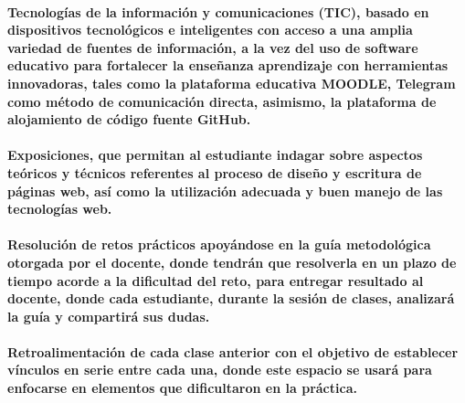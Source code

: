 \paragraph{\textbf{Tecnologías de la información y comunicaciones (TIC)}, basado en dispositivos tecnológicos e inteligentes con acceso a una amplia variedad de fuentes de información, a la vez del uso de software educativo para fortalecer la enseñanza aprendizaje con herramientas innovadoras, tales como la plataforma educativa MOODLE, Telegram como método de comunicación directa, asimismo, la plataforma de alojamiento de código fuente GitHub.}

\paragraph{\textbf{Exposiciones}, que permitan al estudiante indagar sobre aspectos teóricos y técnicos referentes al proceso de diseño y escritura de páginas web, así como la utilización adecuada y buen manejo de las tecnologías web.}

\paragraph{\textbf{Resolución de retos prácticos} apoyándose en la guía metodológica otorgada por el docente, donde tendrán que resolverla en un plazo de tiempo acorde a la dificultad del reto, para entregar resultado al docente, donde cada estudiante, durante la sesión de clases, analizará la guía y compartirá sus dudas.}

\paragraph{\textbf{Retroalimentación} de cada clase anterior con el objetivo de establecer vínculos en serie entre cada una, donde este espacio se usará para enfocarse en elementos que dificultaron en la práctica.}

